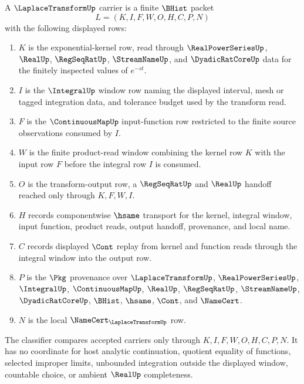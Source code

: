 \begin{definition}
\label{def:laplace-transform-carrier}
A $\LaplaceTransformUp$ carrier is a finite $\BHist$ packet
$$
L=(K,I,F,W,O,H,C,P,N)
$$
with the following displayed rows:
\begin{enumerate}
\item $K$ is the exponential-kernel row, read through $\RealPowerSeriesUp$, $\RealUp$, $\RegSeqRatUp$, $\StreamNameUp$, and $\DyadicRatCoreUp$ data for the finitely inspected values of $e^{-st}$.
\item $I$ is the $\IntegralUp$ window row naming the displayed interval, mesh or tagged integration data, and tolerance budget used by the transform read.
\item $F$ is the $\ContinuousMapUp$ input-function row restricted to the finite source observations consumed by $I$.
\item $W$ is the finite product-read window combining the kernel row $K$ with the input row $F$ before the integral row $I$ is consumed.
\item $O$ is the transform-output row, a $\RegSeqRatUp$ and $\RealUp$ handoff reached only through $K,F,W,I$.
\item $H$ records componentwise $\hsame$ transport for the kernel, integral window, input function, product reads, output handoff, provenance, and local name.
\item $C$ records displayed $\Cont$ replay from kernel and function reads through the integral window into the output row.
\item $P$ is the $\Pkg$ provenance over $\LaplaceTransformUp$, $\RealPowerSeriesUp$, $\IntegralUp$, $\ContinuousMapUp$, $\RealUp$, $\RegSeqRatUp$, $\StreamNameUp$, $\DyadicRatCoreUp$, $\BHist$, $\hsame$, $\Cont$, and $\NameCert$.
\item $N$ is the local $\NameCert_{\LaplaceTransformUp}$ row.
\end{enumerate}
The classifier compares accepted carriers only through $K,I,F,W,O,H,C,P,N$. It has no coordinate for host analytic continuation, quotient equality of functions, selected improper limits, unbounded integration outside the displayed window, countable choice, or ambient $\RealUp$ completeness.
\end{definition}

